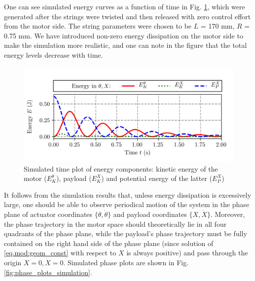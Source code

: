One can see simulated energy curves as a function of time in Fig. \ref{fig:energies_simulation}, which were generated after the strings were twisted and then released with zero control effort from the motor side. The string parameters were chosen to be $L$ = 170 mm, $R$ = 0.75 mm. We have introduced non-zero energy dissipation on the motor side to make the simulation more realistic, and one can note in the figure that the total energy levels decrease with time. 
\begin{figure}
		\centering
		\includegraphics[trim= 0.0cm 0.8cm 0.0cm 0.0cm,width=1.0\columnwidth]{pics/plots/energy_damp.png}
		\caption{Simulated time plot of energy components: kinetic energy of the motor ($E_K^\theta$), payload ($E_K^X$) and potential energy of the latter ($E_P^X$)} 
 		\label{fig:energies_simulation}
		\vspace*{-2mm} 
\end{figure}


It follows from the simulation results that, unless energy dissipation is excessively large, one should be able to observe periodical motion of the system in the phase plane of actuator coordinates $\{\theta, \dot{\theta}\}$ and payload coordinates $\{X,\dot{X}\}$. Moreover, the phase trajectory in the motor space should theoretically lie in all four quadrants of the phase plane, while the payload's phase trajectory must be fully contained on the right hand side of the phase plane (since solution of \eqref{eq.mod:geom_const} with respect to $X$ is always positive) and pass through the origin $X = 0 , \dot{X} = 0$. Simulated phase plots are shown in Fig. \ref{fig:phase_plots_simulation}.


